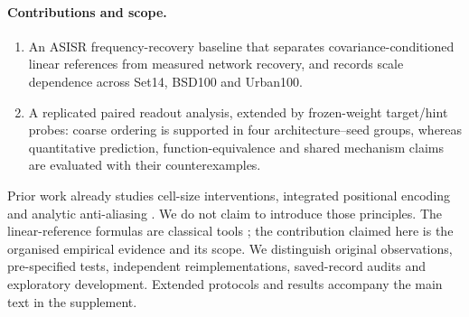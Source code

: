 \paragraph{Contributions and scope.}
\begin{enumerate}
\item An ASISR frequency-recovery baseline that separates covariance-conditioned linear references from measured network recovery, and records scale dependence across Set14, BSD100 and Urban100.
\item A replicated paired readout analysis, extended by frozen-weight target/hint probes: coarse ordering is supported in four architecture--seed groups, whereas quantitative prediction, function-equivalence and shared mechanism claims are evaluated with their counterexamples.
\end{enumerate}
Prior work already studies cell-size interventions, integrated positional encoding and analytic anti-aliasing \citep{chen2021liif,liu2021ipe,becker2025thera}. We do not claim to introduce those principles. The linear-reference formulas are classical tools \citep{kay1993estimation,rasmussen2006gp}; the contribution claimed here is the organised empirical evidence and its scope. We distinguish original observations, pre-specified tests, independent reimplementations, saved-record audits and exploratory development. Extended protocols and results accompany the main text in the supplement.
